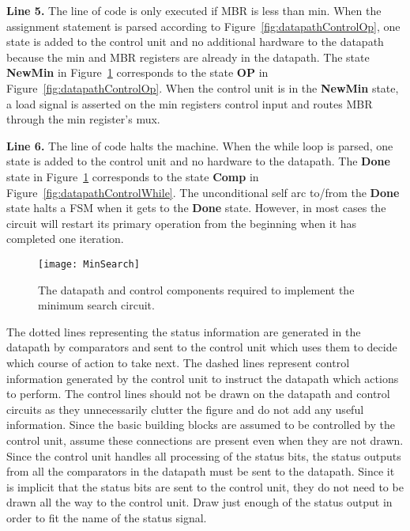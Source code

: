 \textbf{ Line 5.}  The line of code is only executed if MBR is less than min.
When the assignment statement is parsed according to Figure~\ref{fig:datapathControlOp},
one state is added to the control unit and no additional hardware
to the datapath because the min and MBR registers are already in the datapath.
The state \textbf{NewMin} in Figure~\ref{fig:datapathControlMinSearch} corresponds to the state
\textbf{OP} in Figure~\ref{fig:datapathControlOp}.  When the control unit is in the \textbf{NewMin}
state, a load signal is asserted on the min registers control input
and routes MBR through the min register's mux.

\textbf{ Line 6.}  The line of code halts the machine.  When the while loop is parsed,
one state is added to the control unit and no hardware to the
datapath.  The \textbf{Done} state in Figure~\ref{fig:datapathControlMinSearch} corresponds to
the state \textbf{Comp} in Figure~\ref{fig:datapathControlWhile}.  The unconditional self arc
to/from the \textbf{Done} state halts a FSM when it gets to the \textbf{Done}
state.  However, in most cases the circuit will restart its primary
operation from the beginning when it has completed one iteration.

\begin{figure}[ht]
    \texttt{[image: MinSearch]}
    \caption{The datapath and control components required to implement
    the minimum search circuit.}
    \label{fig:datapathControlMinSearch}
\end{figure}

The dotted lines representing the status information are generated in the
datapath by comparators and sent to the control unit which uses them to
decide which course of action to take next.  The dashed lines
represent control information generated by the control unit to instruct
the datapath which actions to perform.  The control lines should not be
drawn on the datapath and control circuits as they unnecessarily clutter
the figure and do not add any useful information.  Since the basic
building blocks are assumed to be controlled by the control unit,
assume these connections are present even when they are not drawn.
Since the control unit handles all processing of the status bits,
the status outputs from all the comparators in the datapath must
be sent to the datapath.  Since it is implicit that the status bits
are sent to the control unit, they do not need to be drawn all the
way to the control unit.  Draw just enough of the status output
in order to fit the name of the status signal.

